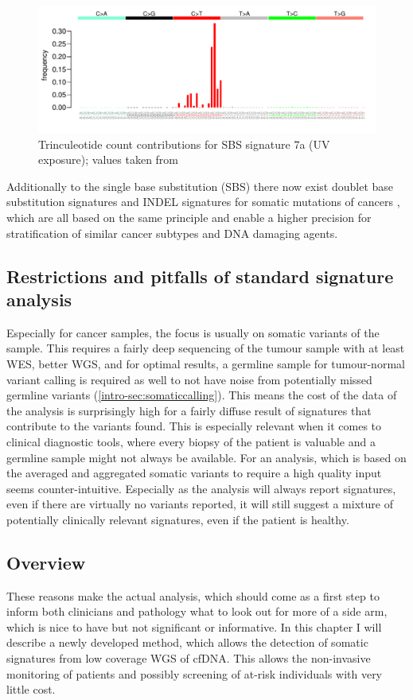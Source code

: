 \begin{figure}[!ht]
\centering
\includegraphics[width=.99\linewidth]{Figures/SBS7aSignature.pdf}
\caption[Trinculeotide count contributions for single base substitution (SBS) signature 7a]{Trinculeotide count contributions for SBS signature 7a (UV exposure); values taken from \protect\textcite{Alexandrov2020}}\label{fig:sig7a}
\end{figure}

Additionally to the single base substitution (SBS) there now exist doublet base substitution signatures and INDEL signatures for somatic mutations of cancers \cite{Alexandrov2020}, which are all based on the same principle and enable a higher precision for stratification of similar cancer subtypes and DNA damaging agents.

\subsection{Restrictions and pitfalls of standard signature analysis}
Especially for cancer samples, the focus is usually on somatic variants of the sample. This requires a fairly deep sequencing of the tumour sample with at least WES, better WGS, and for optimal results, a germline sample for tumour-normal variant calling is required as well to not have noise from potentially missed germline variants (\autoref{intro-sec:somaticcalling}). This means the cost of the data of the analysis is surprisingly high for a fairly diffuse result of signatures that contribute to the variants found. This is especially relevant when it comes to clinical diagnostic tools, where every biopsy of the patient is valuable and a germline sample might not always be available. For an analysis, which is based on the averaged and aggregated somatic variants to require a high quality input seems counter-intuitive.
Especially as the analysis will always report signatures, even if there are virtually no variants reported, it will still suggest a mixture of potentially clinically relevant signatures, even if the patient is healthy.

\subsection{Overview}
These reasons make the actual analysis, which should come as a first step to inform both clinicians and pathology what to look out for more of a side arm, which is nice to have but not significant or informative. In this chapter I will describe a newly developed method, which allows the detection of somatic signatures from low coverage WGS of cfDNA. This allows the non-invasive monitoring of patients and possibly screening of at-risk individuals with very little cost.
